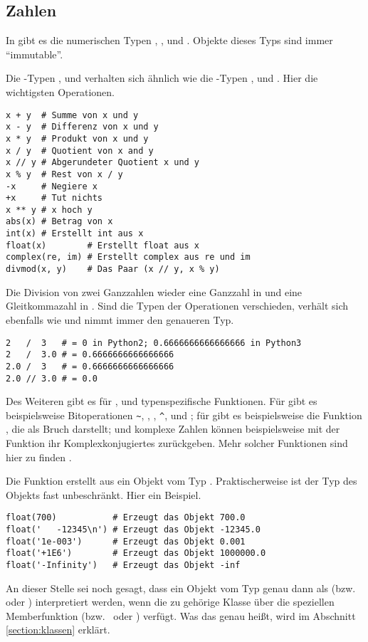\subsection{Zahlen}
\label{section:std_data_types:zahlen}
In \Python gibt es die numerischen Typen , ,  und .
Objekte dieses Typs sind immer ``immutable''.

Die \Python-Typen ,  und  verhalten sich ähnlich wie die \CC-Typen ,  und .
Hier die wichtigsten Operationen.
\begin{lstlisting}
x + y  # Summe von x und y
x - y  # Differenz von x und y
x * y  # Produkt von x und y
x / y  # Quotient von x and y
x // y # Abgerundeter Quotient x und y
x % y  # Rest von x / y
-x     # Negiere x
+x     # Tut nichts
x ** y # x hoch y
abs(x) # Betrag von x
int(x) # Erstellt int aus x
float(x)        # Erstellt float aus x
complex(re, im) # Erstellt complex aus re und im
divmod(x, y)    # Das Paar (x // y, x % y)
\end{lstlisting}
Die Division von zwei Ganzzahlen wieder eine Ganzzahl in \PythonZwei und eine Gleitkommazahl in \PythonDrei.
Sind die Typen der Operationen verschieden, verhält sich \Python ebenfalls wie \CC und nimmt immer den genaueren Typ.
\begin{lstlisting}
2   /  3   # = 0 in Python2; 0.6666666666666666 in Python3
2   /  3.0 # = 0.6666666666666666
2.0 /  3   # = 0.6666666666666666
2.0 // 3.0 # = 0.0
\end{lstlisting}

Des Weiteren gibt es für ,  und  typenspezifische Funktionen.
Für  gibt es beispielsweise Bitoperationen \lstinline[style=PyInline]|~|, \lpy{|}, \lpy{&}, \lstinline[style=PyInline]|^|, \lpy{<<} und \lpy{>>};
für  gibt es beispielsweise die Funktion , die  als Bruch darstellt;
und komplexe Zahlen können beispielsweise mit der Funktion  ihr Komplexkonjugiertes zurückgeben.
Mehr solcher Funktionen sind hier zu finden \cite[Library, Build-in Types, Numeric Types]{Python3}.

Die Funktion  erstellt aus  ein Objekt vom Typ .
Praktischerweise ist der Typ des Objekts  fast unbeschränkt.
Hier ein Beispiel.
\begin{lstlisting}
float(700)           # Erzeugt das Objekt 700.0
float('   -12345\n') # Erzeugt das Objekt -12345.0
float('1e-003')      # Erzeugt das Objekt 0.001
float('+1E6')        # Erzeugt das Objekt 1000000.0
float('-Infinity')   # Erzeugt das Objekt -inf
\end{lstlisting}
An dieser Stelle sei noch gesagt, dass ein Objekt vom Typ  genau dann als  (bzw.\  oder ) interpretiert werden,
wenn die zu  gehörige Klasse über die speziellen Memberfunktion  (bzw.\  oder ) verfügt.
Was das genau heißt, wird im Abschnitt \ref{section:klassen} erklärt.
